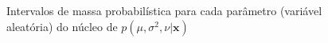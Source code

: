 \begin{figure}[htb]
	\caption{Intervalos de massa probabilística para cada parâmetro (variável aleatória) do núcleo de $p(\mu, \sigma^2, \nu | \bm{x})$}%
\end{figure}
\newpage